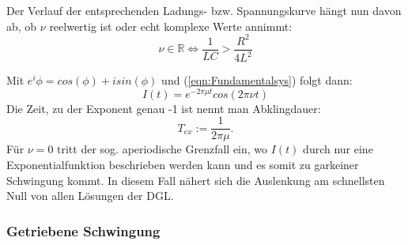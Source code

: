 \documentclass{scrartcl}
\begin{document}
          Der Verlauf der entsprechenden Ladungs- bzw. Spannungskurve hängt nun davon ab,
          ob $\nu$ reelwertig ist oder echt komplexe Werte annimmt:
          \begin{equation*}
              \nu \in \mathbb{R} \iff \frac{1}{LC} > \frac{R^2}{4L^2}
          \end{equation*}

          Mit $e^i\phi= cos(\phi)+isin(\phi)$ und (\ref{eqn:Fundamentalsys}) folgt dann:
          \begin{equation}
              I(t) = e^{-2\pi\mu t}cos(2\pi\nu t)
          \end{equation}
          Die Zeit, zu der Exponent genau -1 ist nennt man Abklingdauer:
          \begin{equation}
              T_{ex} := \frac{1}{2\pi\mu}.
              \label{eqn:Abkling}
          \end{equation}
          Für $\nu = 0$ tritt der sog. aperiodische Grenzfall ein,
          wo $I(t)$ durch nur eine Exponentialfunktion beschrieben werden kann und es somit zu garkeiner Schwingung kommt.
          In diesem Fall nähert sich die Auslenkung am schnellsten Null von allen Lösungen der DGL.
          \subsubsection{Getriebene Schwingung}
          \label{subs:Getriebene Schwingung}
\end{document}
